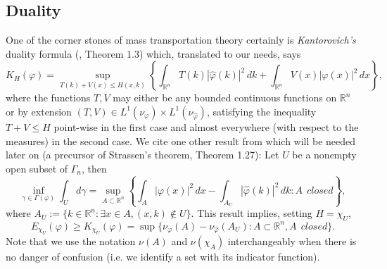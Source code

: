 \documentclass[12pt,a4paper,draft]{article}
\newcommand{\RR}[1]{\mathbb{R}^#1}
\begin{document}
\subsection{Duality}
One of the corner stones of mass transportation theory certainly is 
{\sl Kantorovich's} duality formula (\cite{villani_topics_2003}, Theorem 1.3)
which, translated to our needs, says
\begin{equation}
   K_H(\varphi) = \sup_{T(k)+V(x) \leq H(x,k)} 
              \left\{ \int_{\RR n} T(k) |\hat\varphi(k)|^2 \,dk +
                               \int_{\RR n} V(x) |\varphi(x)|^2 \,dx                         
                                      \right\},
\end{equation}
where the functions $T,V$ may either be any bounded continuous functions on $\RR n$
or by extension $(T,V)\in L^1(\nu_{\varphi})\times L^1(\nu_{\hat\varphi})$,
satisfying the inequality $T+V\leq H$ point-wise in the first case and almost
everywhere (with respect to the measures) in the second case. 
We cite one other result from \cite{villani_topics_2003} which will be needed
later on (a precursor of Strassen's theorem, Theorem 1.27): 
Let $U$ be a nonempty open subset of $\Gamma_n$, then
\begin{equation}\label{Strassen}
     \inf_{\gamma\in\Gamma(\varphi)} \int_{U} d\gamma =
       \sup_{A\subset{\RR n}} 
          \left\{ 
            \int_{A} |\varphi(x)|^2\,dx -
            \int_{A_U} |\hat\varphi(k)|^2\, dk : A\,\; closed 
          \right\},                                                 
\end{equation}
where $A_U:=\{k\in{\RR n}: \exists x\in A , (x,k)\notin U \}$. This result
implies, setting $H=\chi_U$,
\begin{displaymath}
  E_{\chi_U}(\varphi)\geq K_{\chi_U}(\varphi)=
        \sup\{ \nu_{\varphi}(A)-\nu_{\hat\varphi}(A_U)
            : A\subset{\RR n},A\,\;closed \}. 
\end{displaymath}
Note that we use the notation $\nu(A)$ and $\nu(\chi_A)$ interchangeably when
there is no danger of confusion (i.e. we identify a set with its indicator 
function).
%
\end{document}
